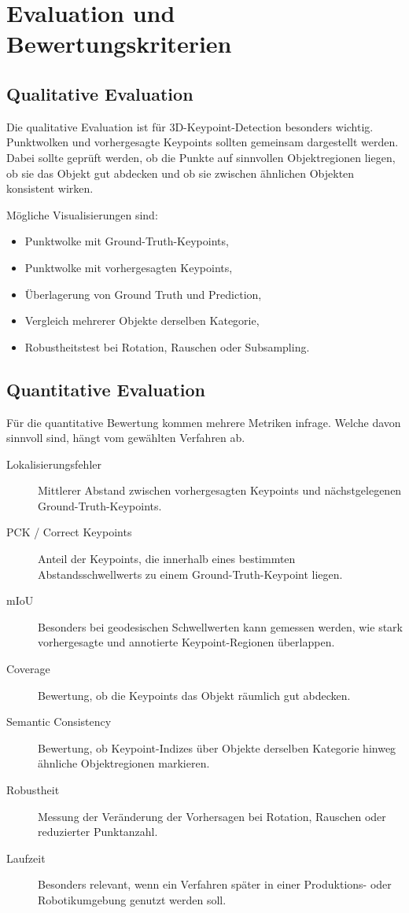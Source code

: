 \documentclass[11pt,a4paper]{article}
\begin{document}
\section{Evaluation und Bewertungskriterien}

\subsection{Qualitative Evaluation}

Die qualitative Evaluation ist für 3D-Keypoint-Detection besonders wichtig. Punktwolken und vorhergesagte Keypoints sollten gemeinsam dargestellt werden. Dabei sollte geprüft werden, ob die Punkte auf sinnvollen Objektregionen liegen, ob sie das Objekt gut abdecken und ob sie zwischen ähnlichen Objekten konsistent wirken.

Mögliche Visualisierungen sind:

\begin{itemize}
    \item Punktwolke mit Ground-Truth-Keypoints,
    \item Punktwolke mit vorhergesagten Keypoints,
    \item Überlagerung von Ground Truth und Prediction,
    \item Vergleich mehrerer Objekte derselben Kategorie,
    \item Robustheitstest bei Rotation, Rauschen oder Subsampling.
\end{itemize}

\subsection{Quantitative Evaluation}

Für die quantitative Bewertung kommen mehrere Metriken infrage. Welche davon sinnvoll sind, hängt vom gewählten Verfahren ab.

\begin{description}
    \item[Lokalisierungsfehler] Mittlerer Abstand zwischen vorhergesagten Keypoints und nächstgelegenen Ground-Truth-Keypoints.
    \item[PCK / Correct Keypoints] Anteil der Keypoints, die innerhalb eines bestimmten Abstandsschwellwerts zu einem Ground-Truth-Keypoint liegen.
    \item[mIoU] Besonders bei geodesischen Schwellwerten kann gemessen werden, wie stark vorhergesagte und annotierte Keypoint-Regionen überlappen.
    \item[Coverage] Bewertung, ob die Keypoints das Objekt räumlich gut abdecken.
    \item[Semantic Consistency] Bewertung, ob Keypoint-Indizes über Objekte derselben Kategorie hinweg ähnliche Objektregionen markieren.
    \item[Robustheit] Messung der Veränderung der Vorhersagen bei Rotation, Rauschen oder reduzierter Punktanzahl.
    \item[Laufzeit] Besonders relevant, wenn ein Verfahren später in einer Produktions- oder Robotikumgebung genutzt werden soll.
\end{description}
\end{document}
